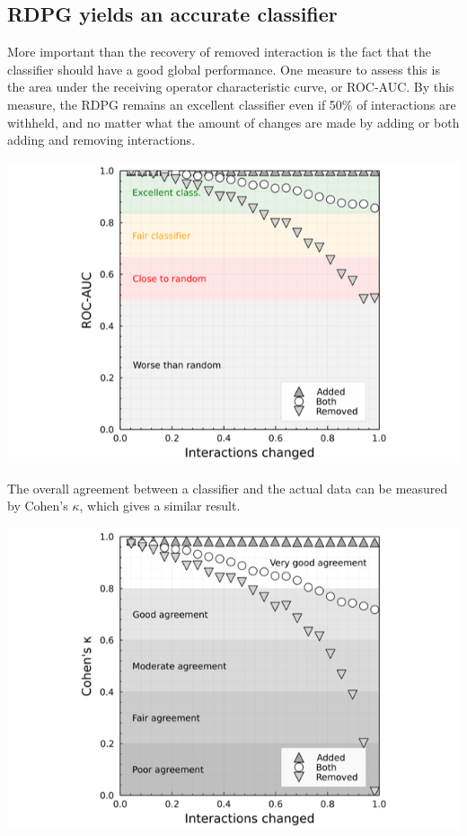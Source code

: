 \subsection{RDPG yields an accurate
classifier}\label{rdpg-yields-an-accurate-classifier}

More important than the recovery of removed interaction is the fact that
the classifier should have a good global performance. One measure to
assess this is the area under the receiving operator characteristic
curve, or ROC-AUC. By this measure, the RDPG remains an excellent
classifier even if 50\% of interactions are withheld, and no matter what
the amount of changes are made by adding or both adding and removing
interactions.


\includegraphics[width=\textwidth]{./figures/supplementary/sensibility_rocauc.png}

The overall agreement between a classifier and the actual data can be
measured by Cohen's \(\kappa\), which gives a similar result.

\includegraphics[width=\textwidth]{./figures/supplementary/sensibility_kappa.png}

